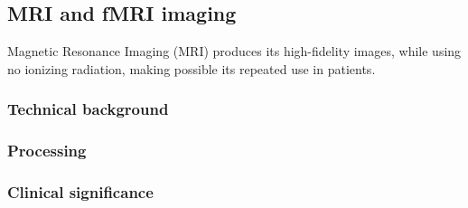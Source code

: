 	
	
	
	\subsection{MRI and fMRI imaging}
	
	Magnetic Resonance Imaging (MRI) produces its high-fidelity images, while using no ionizing radiation, making possible its repeated use in patients. 
	
		\subsubsection{Technical background}
		
		
		
		\subsubsection{Processing}
		
		
		\subsubsection{Clinical significance }
